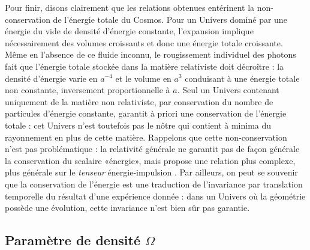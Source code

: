 Pour finir, disons clairement que les relations obtenues entérinent la non-conservation de l'énergie totale du Cosmos. Pour un Univers dominé par une énergie du vide de densité d'énergie constante, l'expansion implique nécessairement des volumes croissants et donc une énergie totale croissante.  Même en l'absence de ce fluide inconnu, le rougissement individuel des photons fait que l'énergie totale stockée dans la matière relativiste doit décroître : la densité d'énergie varie en $a^{-4}$ et le volume en $a^3$ conduisant à une énergie totale non constante, inversement proportionnelle à $a$. Seul un Univers contenant uniquement de la matière non relativiste, par conservation du nombre de particules d'énergie constante, garantit à priori une conservation de l'énergie totale : cet Univers n'est toutefois pas le nôtre qui contient à minima du rayonnement en plus de cette matière. Rappelons que cette non-conservation n'est pas problématique : la relativité générale ne garantit pas de façon générale la conservation du scalaire «énergie», mais propose une relation plus complexe, plus générale sur le \textit{tenseur} énergie-impulsion . Par ailleurs, on peut se souvenir que la conservation de l'énergie est une traduction de l'invariance par translation temporelle du résultat d'une expérience donnée : dans un Univers où la géométrie possède une évolution, cette invariance n'est bien sûr pas garantie.

\subsection{Paramètre de densité $\Omega$}

